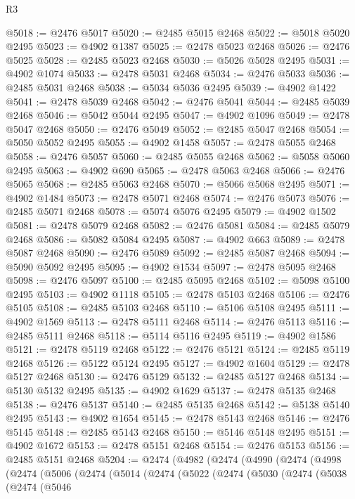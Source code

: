 \begin{lexlean}{R3}
\begin{coremodule}
@5018 := @2476 @5017
@5020 := @2485 @5015 @2468
@5022 := @5018 @5020 @2495
@5023 := @4902 @1387
@5025 := @2478 @5023 @2468
@5026 := @2476 @5025
@5028 := @2485 @5023 @2468
@5030 := @5026 @5028 @2495
@5031 := @4902 @1074
@5033 := @2478 @5031 @2468
@5034 := @2476 @5033
@5036 := @2485 @5031 @2468
@5038 := @5034 @5036 @2495
@5039 := @4902 @1422
@5041 := @2478 @5039 @2468
@5042 := @2476 @5041
@5044 := @2485 @5039 @2468
@5046 := @5042 @5044 @2495
@5047 := @4902 @1096
@5049 := @2478 @5047 @2468
@5050 := @2476 @5049
@5052 := @2485 @5047 @2468
@5054 := @5050 @5052 @2495
@5055 := @4902 @1458
@5057 := @2478 @5055 @2468
@5058 := @2476 @5057
@5060 := @2485 @5055 @2468
@5062 := @5058 @5060 @2495
@5063 := @4902 @690
@5065 := @2478 @5063 @2468
@5066 := @2476 @5065
@5068 := @2485 @5063 @2468
@5070 := @5066 @5068 @2495
@5071 := @4902 @1484
@5073 := @2478 @5071 @2468
@5074 := @2476 @5073
@5076 := @2485 @5071 @2468
@5078 := @5074 @5076 @2495
@5079 := @4902 @1502
@5081 := @2478 @5079 @2468
@5082 := @2476 @5081
@5084 := @2485 @5079 @2468
@5086 := @5082 @5084 @2495
@5087 := @4902 @663
@5089 := @2478 @5087 @2468
@5090 := @2476 @5089
@5092 := @2485 @5087 @2468
@5094 := @5090 @5092 @2495
@5095 := @4902 @1534
@5097 := @2478 @5095 @2468
@5098 := @2476 @5097
@5100 := @2485 @5095 @2468
@5102 := @5098 @5100 @2495
@5103 := @4902 @1118
@5105 := @2478 @5103 @2468
@5106 := @2476 @5105
@5108 := @2485 @5103 @2468
@5110 := @5106 @5108 @2495
@5111 := @4902 @1569
@5113 := @2478 @5111 @2468
@5114 := @2476 @5113
@5116 := @2485 @5111 @2468
@5118 := @5114 @5116 @2495
@5119 := @4902 @1586
@5121 := @2478 @5119 @2468
@5122 := @2476 @5121
@5124 := @2485 @5119 @2468
@5126 := @5122 @5124 @2495
@5127 := @4902 @1604
@5129 := @2478 @5127 @2468
@5130 := @2476 @5129
@5132 := @2485 @5127 @2468
@5134 := @5130 @5132 @2495
@5135 := @4902 @1629
@5137 := @2478 @5135 @2468
@5138 := @2476 @5137
@5140 := @2485 @5135 @2468
@5142 := @5138 @5140 @2495
@5143 := @4902 @1654
@5145 := @2478 @5143 @2468
@5146 := @2476 @5145
@5148 := @2485 @5143 @2468
@5150 := @5146 @5148 @2495
@5151 := @4902 @1672
@5153 := @2478 @5151 @2468
@5154 := @2476 @5153
@5156 := @2485 @5151 @2468
@5204 := @2474
    (@4982
      (@2474
        (@4990
          (@2474
            (@4998
              (@2474
                (@5006
                  (@2474
                    (@5014
                      (@2474
                        (@5022
                          (@2474
                            (@5030
                              (@2474
                                (@5038
                                  (@2474
                                    (@5046

\end{coremodule}
\end{lexlean}
